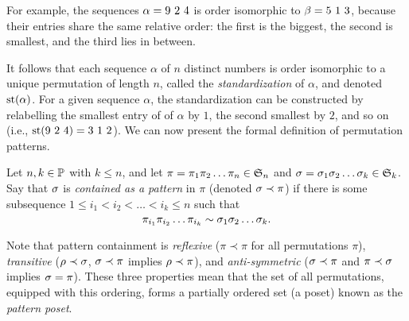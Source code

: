     For example, the sequences $\alp = 9\ 2\ 4$ is order isomorphic to $\bta  = 5\
    1\ 3$, because their entries share the same relative order: the first is
    the biggest, the second is smallest, and the third lies in between. 

    It follows that each sequence $\alpha$ of $n$ distinct numbers is order
    isomorphic to a unique permutation of length $n$, called the \emph{standardization}
    of $\alpha$, and  denoted $\std(\alpha)$. For a given sequence $\alpha$, the
    standardization can be constructed by relabelling the smallest entry of of
    $\alpha$ by $1$, the second smallest by $2$, and so on (i.e., $\std(9\ 2\
    4) = 3\ 1\ 2$). We can now present the formal definition of permutation
    patterns. 

    \begin{definition} \label{prelim:def:patterns}
      Let $n, k \in \Pos$ with $k \leq n$, and let $\pi = \pi_1 \pi_2 \dots
      \pi_n \in \S_n$ and $\sg = \sg_1 \sg_2 \dots \sg_k \in
      \S_k$. Say that $\sg$ is \emph{contained as a pattern} in $\pi$ (denoted
      $\sg \prec \pi$) if there is some subsequence $1 \leq i_1 < i_2 < \dots
      <i_k \leq n$ such that 
      $$ \pi_{i_1} \pi_{i_2} \dots \pi_{i_k} \sim \sg_1 \sg_2 \dots \sg_k.$$
    \end{definition}


    Note that pattern containment is \emph{reflexive}
    ($\pi \prec \pi$ for all permutations $\pi$), \emph{transitive} ($\ro \prec
    \sg$, $\sg \prec \pi$ implies $\ro \prec \pi$), and \emph{anti-symmetric}
    ($\sg \prec \pi$ and $\pi \prec \sg$ implies $\sg = \pi$). These three
    properties mean that the set of all permutations, equipped with this
    ordering, forms a partially ordered set (a poset) known as the
    \emph{pattern poset}. 
    

